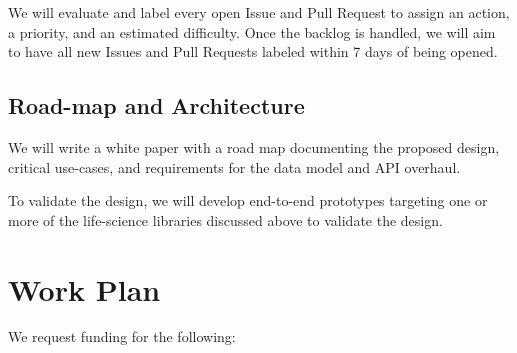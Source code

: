 \documentclass[11pt,letterpaper]{article}  %
\begin{document}
We will evaluate and label every open Issue and Pull Request to
assign an action, a priority, and an estimated
difficulty.  Once the backlog is handled, we will aim to have all new Issues and
Pull Requests labeled within 7 days of being opened.

\subsection{Road-map and Architecture}

We will write a white paper with a road map documenting the proposed
design, critical use-cases, and requirements for the data model and
API overhaul.

To validate the design, we will develop end-to-end prototypes
targeting one or more of the life-science libraries discussed above
to validate the design.


\section{Work Plan}

We request funding for the following:
\end{document}
